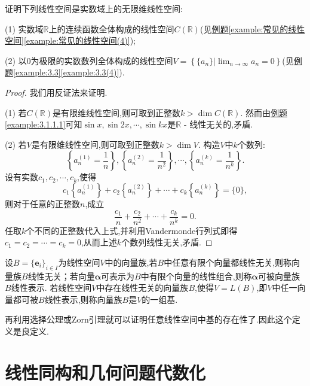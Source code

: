 \documentclass[lang=cn,newtx,10pt,scheme=chinese]{elegantbook}
\begin{document}
\begin{example}
证明下列线性空间是实数域上的无限维线性空间:

(1) 实数域\(\mathbb{R}\)上的连续函数全体构成的线性空间\(C(\mathbb{R})\)(见\hyperref[example:常见的线性空间(4)]{例题\ref{example:常见的线性空间}\ref{example:常见的线性空间(4)}});

(2) 以\(0\)为极限的实数数列全体构成的线性空间\(V = \left\{\{a_n\}|\lim_{n\rightarrow\infty}a_n = 0\right\}\)(见\hyperref[example:3.3(4)]{例题\ref{example:3.3}\ref{example:3.3(4)}}).
\end{example}
\begin{proof}
我们用反证法来证明.

(1) 若\(C(\mathbb{R})\)是有限维线性空间,则可取到正整数\(k>\dim C(\mathbb{R})\). 然而由\hyperref[example:3.1.1.1]{例题\ref{example:3.1.1.1}}可知\(\sin x,\sin 2x,\cdots,\sin kx\)是\(\mathbb{R}\) - 线性无关的,矛盾.

(2) 若\(V\)是有限维线性空间,则可取到正整数\(k>\dim V\). 构造\(V\)中\(k\)个数列:
\[
\left\{a_n^{(1)}=\frac{1}{n}\right\},\left\{a_n^{(2)}=\frac{1}{n^2}\right\},\cdots,\left\{a_n^{(k)}=\frac{1}{n^k}\right\}.
\]
设有实数\(c_1,c_2,\cdots,c_k\),使得
\[
c_1\left\{a_n^{(1)}\right\}+c_2\left\{a_n^{(2)}\right\}+\cdots + c_k\left\{a_n^{(k)}\right\}=\{0\},
\]
则对于任意的正整数\(n\),成立
\[
\frac{c_1}{n}+\frac{c_2}{n^2}+\cdots+\frac{c_k}{n^k}=0.
\]
任取\(k\)个不同的正整数代入上式,并利用Vandermonde行列式即得\(c_1 = c_2=\cdots = c_k = 0\),从而上述\(k\)个数列线性无关,矛盾. 
\end{proof}

\begin{definition}[无限维空间基的定义]\label{definition:无限维空间基的定义}
设\(B = \{ \boldsymbol{e}_i\}_{i\in I}\)为线性空间\(V\)中的向量族,若\(B\)中任意有限个向量都线性无关,则称向量族\(B\)线性无关；若向量\(\boldsymbol{\alpha}\)可表示为\(B\)中有限个向量的线性组合,则称\(\boldsymbol{\alpha}\)可被向量族\(B\)线性表示. 若线性空间\(V\)中存在线性无关的向量族\(B\),使得\(V = L(B)\),即\(V\)中任一向量都可被\(B\)线性表示,则称向量族\(B\)是\(V\)的一组基.
\end{definition}
\begin{note}
再利用选择公理或Zorn引理就可以证明任意线性空间中基的存在性了.因此这个定义是良定义.
\end{note}

\section{线性同构和几何问题代数化}
\end{document}
